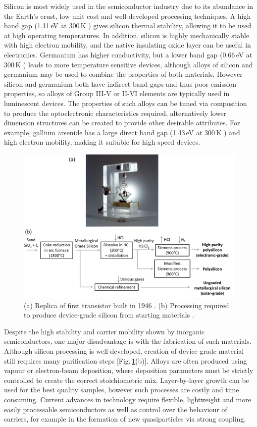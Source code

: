 Silicon is most widely used in the semiconductor industry due to its abundance in the Earth's crust, low unit cost and well-developed processing techniques. A high band gap (1.11\,eV at 300\,K \cite{Kittel1986}) gives silicon thermal stability, allowing it to be used at high operating temperatures. In addition, silicon is highly mechanically stable with high electron mobility, and the native insulating oxide layer can be useful in electronics. Germanium has higher conductivity, but a lower band gap (0.66\,eV at 300\,K \cite{Kittel1986}) leads to more temperature sensitive devices, although alloys of silicon and germanium may be used to combine the properties of both materials. However silicon and germanium both have indirect band gaps and thus poor emission properties, so alloys of Group III-V or II-VI elements are typically used in luminescent devices. The properties of such alloys can be tuned via composition to produce the optoelectronic characteristics required, alternatively lower dimension structures can be created to provide other desirable attributes. For example, gallium arsenide has a large direct band gap (1.43\,eV at 300\,K \cite{Kittel1986}) and high electron mobility, making it suitable for high speed devices.
\begin{figure}[h!]
\centering
\includegraphics[width=\textwidth]{Fig1}
\caption{(a) Replica of first transistor built in 1946 \cite{Transistor}. (b) Processing required to produce device-grade silicon from starting materials \cite{Silicon}.}
\label{1Fig1}
\end{figure}

Despite the high stability and carrier mobility shown by inorganic semiconductors, one major disadvantage is with the fabrication of such materials. Although silicon processing is well-developed, creation of device-grade material still requires many purification steps [Fig.\,\ref{1Fig1}(b)]. Alloys are often produced using vapour or electron-beam deposition, where deposition parameters must be strictly controlled to create the correct stoichiometric mix. Layer-by-layer growth can be used for the best quality samples, however such processes are costly and time consuming. Current advances in technology require flexible, lightweight and more easily processable semiconductors as well as control over the behaviour of carriers, for example in the formation of new quasiparticles via strong coupling.

